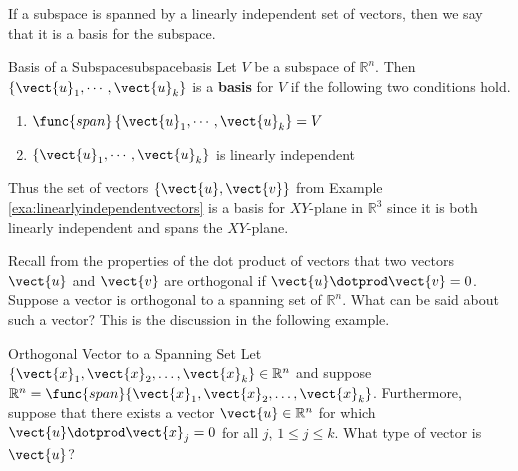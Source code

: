 If a subspace is spanned by a linearly independent set of vectors,
then we say that it is a basis for the subspace.

\begin{definition}{Basis of a Subspace}{subspacebasis}
Let $V$ be a subspace of $\mathbb{R}^{n}$. Then $\left\{
\vect{u}_{1},\cdots ,\vect{u}_{k}\right\} $ is a \textbf{basis} for
$V$ if the following two conditions
hold. 

\begin{enumerate}
\item $\func{span}\left\{ \vect{u}_{1},\cdots ,\vect{u}_{k}\right\} =V$
\item $\left\{ \vect{u}_{1},\cdots ,\vect{u}_{k}\right\} $ is linearly
independent
\end{enumerate}
\end{definition}

Thus the set of vectors $\{\vect{u}, \vect{v}\}$ from Example
\ref{exa:linearlyindependentvectors} is a basis for $XY$-plane in
$\mathbb{R}^{3}$ since it is both linearly independent and spans
the $XY$-plane.

 Recall from the properties of the dot product of vectors 
that two vectors $\vect{u}$ and $\vect{v}$ are orthogonal if $\vect{u}
\dotprod \vect{v} = 0$. Suppose a vector is orthogonal to a spanning set of $\mathbb{R}^n$. What can be said about such a vector? This is the discussion in the following example.

\begin{example}{Orthogonal Vector to a Spanning Set}{}
Let $\{\vect{x}_1, \vect{x}_2, \ldots, \vect{x}_k\}\in\mathbb{R}^n$ and
suppose $\mathbb{R}^n=\func{span}\{\vect{x}_1, \vect{x}_2, \ldots, \vect{x}_k\}$.
Furthermore, suppose that there exists a vector $\vect{u}\in\mathbb{R}^n$ for which $\vect{u}\dotprod \vect{x}_j=0$ for all $j$, $1\leq j\leq k$.
What type of vector is $\vect{u}$?
\end{example}


